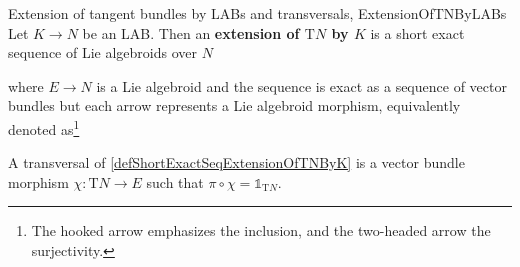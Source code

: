 \begin{definitions}{Extension of tangent bundles by LABs and transversals, \newline \cite[\S 7.1, Definition 7.1.11; page 266; and Definition 7.3.1; page 277]{mackenzieGeneralTheory}}{ExtensionOfTNByLABs}
Let $K \to N$ be an LAB. Then an \textbf{extension of $\mathrm{T}N$ by $K$} is a short exact sequence of Lie algebroids over $N$
\begin{center}
\end{center}
where $E \to N$ is a Lie algebroid and 
the sequence is exact as a sequence of vector bundles but each arrow represents a Lie algebroid morphism,
equivalently denoted as\footnote{The hooked arrow emphasizes the inclusion, and the two-headed arrow the surjectivity.}
\be\label{defShortExactSeqExtensionOfTNByK}
\ee
A transversal of \eqref{defShortExactSeqExtensionOfTNByK} is a vector bundle morphism $\chi: \mathrm{T}N \to E$ such that $\pi \circ \chi = \mathds{1}_{\mathrm{T}N}$.
\end{definitions}

